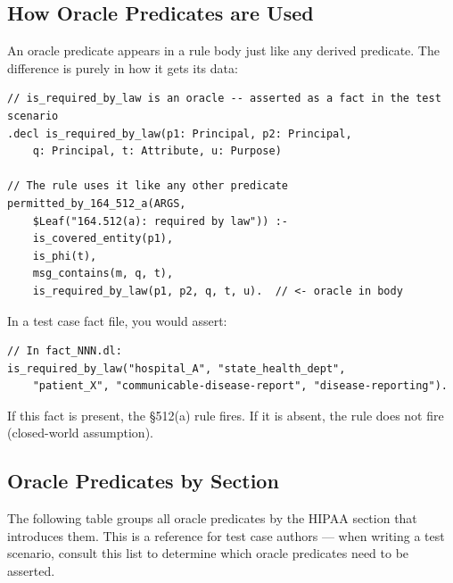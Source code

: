 \documentclass[11pt,letterpaper]{article}
\begin{document}
\subsection{How Oracle Predicates are Used}

An oracle predicate appears in a rule body just like any derived predicate. The difference is purely in how it gets its data:

\begin{lstlisting}[style=soufflestyle,caption={Oracle predicate used in a rule}]
// is_required_by_law is an oracle -- asserted as a fact in the test scenario
.decl is_required_by_law(p1: Principal, p2: Principal,
    q: Principal, t: Attribute, u: Purpose)

// The rule uses it like any other predicate
permitted_by_164_512_a(ARGS,
    $Leaf("164.512(a): required by law")) :-
    is_covered_entity(p1),
    is_phi(t),
    msg_contains(m, q, t),
    is_required_by_law(p1, p2, q, t, u).  // <- oracle in body
\end{lstlisting}

In a test case fact file, you would assert:

\begin{lstlisting}[style=soufflestyle,caption={Asserting an oracle predicate as a fact}]
// In fact_NNN.dl:
is_required_by_law("hospital_A", "state_health_dept",
    "patient_X", "communicable-disease-report", "disease-reporting").
\end{lstlisting}

If this fact is present, the \S 512(a) rule fires. If it is absent, the rule does not fire (closed-world assumption).

\subsection{Oracle Predicates by Section}

The following table groups all oracle predicates by the HIPAA section that introduces them. This is a reference for test case authors --- when writing a test scenario, consult this list to determine which oracle predicates need to be asserted.
\end{document}

